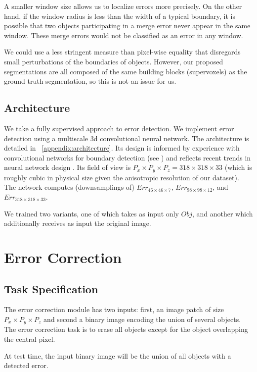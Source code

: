 \documentclass{article}
\begin{document}
A smaller window size allows us to localize errors more precisely. On the other hand, if the window radius is less than the width of a typical boundary, it is possible that two objects participating in a merge error never appear in the same window. These merge errors would not be classified as an error in any window. 

We could use a less stringent measure than pixel-wise equality that disregards small perturbations of the boundaries of objects. However, our proposed segmentations are all composed of the same building blocks (supervoxels) as the ground truth segmentation, so this is not an issue for us.

\subsection{Architecture}
We take a fully supervised approach to error detection. We implement error detection using a multiscale 3d convolutional neural network. The architecture is detailed in ~\ref{appendix:architecture}. Its design is informed by experience with convolutional networks for boundary detection (see \cite{kisuk}) and reflects recent trends in neural network design \cite{unet,resnet}. Its field of view is $P_x\times P_y\times P_z=318\times 318\times 33$ (which is roughly cubic in physical size given the anisotropic resolution of our dataset). The network computes (downsamplings of) $Err_{46 \times 46 \times 7}$, $Err_{98 \times 98 \times 12}$, and $Err_{318 \times 318 \times 33}$.

We trained two variants, one of which takes as input only $Obj$, and another which additionally receives as input the original image. 

\section{Error Correction}
\subsection{Task Specification}
The error correction module has two inputs: first, an image patch of size $P_x\times P_y\times P_z$ and second a binary image encoding the union of several objects. The error correction task is to erase all objects except for the object overlapping the central pixel.

At test time, the input binary image will be the union of all objects with a detected error.
\end{document}
